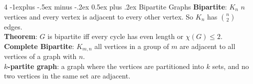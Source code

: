 \documentclass[letterpaper, 8pt]{extarticle}
\makeatletter
\renewcommand{\section}{\@startsection{section}{1}{0mm}%
	{-1explus -.5ex minus -.2ex}%
	{0.5ex plus .2ex}%
	{\normalfont\normalsize\bfseries}}
\makeatother
\begin{document}
\begin{multicols*}{4}
	\section{Bipartite Graphs}
	\textbf{Bipartite}: $K_n$ $n$ vertices and every vertex is adjacent to every other vertex. So $K_n$ has $n \choose 2$ edges. \\
	\textbf{Theorem}: $G$ is bipartite iff every cycle has even length or $\chi(G) \le 2$. \\
	\textbf{Complete Bipartite}: $K_{m,n}$ all vertices in a group of $m$ are adjacent to all vertices of a graph with $n$. \\
	\textbf{$k$-partite graph}: a graph where the vertices are partitioned into $k$ sets, and no two vertices in the same set are adjacent. \\



\end{multicols*}
\end{document}
